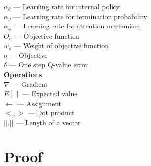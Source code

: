 \documentclass{article}
\begin{document}
	$\alpha_\theta$ --- Learning rate for internal policy\\
	$\alpha_\nu$ --- Learning rate for termination probability\\
	$\alpha_\phi$ --- Learning rate for attention mechanism\\
	$O_o$ --- Objective function\\
	$w_o$ --- Weight of objective function\\
	$o$ --- Objective\\
	$\delta$ --- One step Q-value error\vspace{0.1in}\\
	{\bfseries Operations}\\
	$\nabla$ --- Gradient\\
	$E[\ ]$ --- Expected value\\
	$\leftarrow$ --- Assignment\\
	$<,>$ --- Dot product\\
	$||.||$ --- Length of a vector\\
	\section{Proof}
\end{document}
